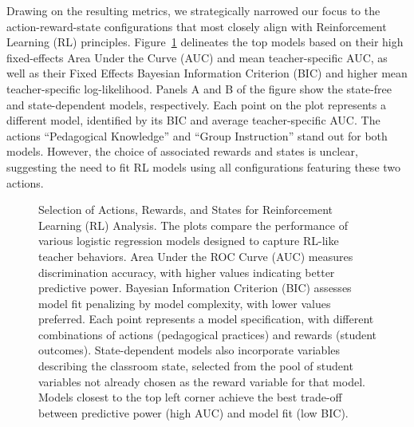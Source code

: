 \documentclass[
  number,
  preprint,
  3p,
  onecolumn]{elsarticle}
\begin{document}
Drawing on the resulting metrics, we strategically narrowed our focus to
the action-reward-state configurations that most closely align with
Reinforcement Learning (RL) principles. Figure~\ref{fig-RL-exploration}
delineates the top models based on their high fixed-effects Area Under
the Curve (AUC) and mean teacher-specific AUC, as well as their Fixed
Effects Bayesian Information Criterion (BIC) and higher mean
teacher-specific log-likelihood. Panels A and B of the figure show the
state-free and state-dependent models, respectively. Each point on the
plot represents a different model, identified by its BIC and average
teacher-specific AUC. The actions ``Pedagogical Knowledge'' and ``Group
Instruction'' stand out for both models. However, the choice of
associated rewards and states is unclear, suggesting the need to fit RL
models using all configurations featuring these two actions.

\begin{figure}

\begin{minipage}{0.50\linewidth}



\end{minipage}%
%
\begin{minipage}{0.50\linewidth}



\end{minipage}%

\caption{\label{fig-RL-exploration}Selection of Actions, Rewards, and
States for Reinforcement Learning (RL) Analysis. The plots compare the
performance of various logistic regression models designed to capture
RL-like teacher behaviors. Area Under the ROC Curve (AUC) measures
discrimination accuracy, with higher values indicating better predictive
power. Bayesian Information Criterion (BIC) assesses model fit
penalizing by model complexity, with lower values preferred. Each point
represents a model specification, with different combinations of actions
(pedagogical practices) and rewards (student outcomes). State-dependent
models also incorporate variables describing the classroom state,
selected from the pool of student variables not already chosen as the
reward variable for that model. Models closest to the top left corner
achieve the best trade-off between predictive power (high AUC) and model
fit (low BIC).}

\end{figure}%
\end{document}
